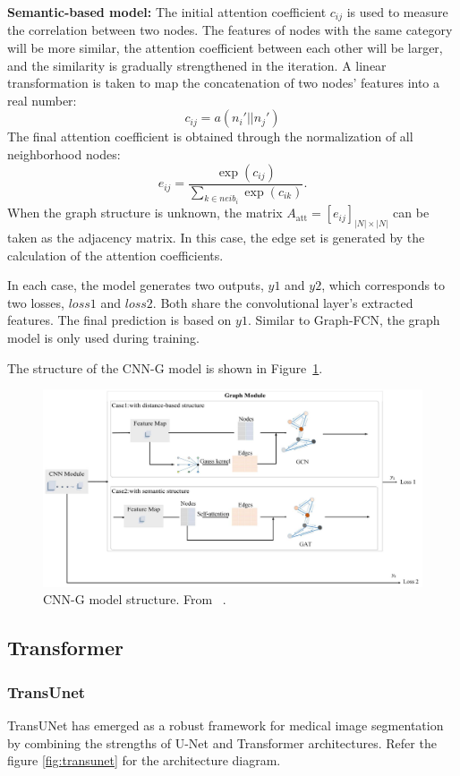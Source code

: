\textbf{Semantic-based model:} The initial attention coefficient $c_{ij}$ is used to measure the correlation between two nodes. The features of nodes with the same category will be more similar, the attention coefficient between each other will be larger, and the similarity is gradually strengthened in the iteration. A linear transformation is taken to map the concatenation of two nodes' features into a real number: 
\[
c_{ij} = a \left( n_i' || n_j' \right)
\]
The final attention coefficient is obtained through the normalization of all neighborhood nodes: 
\[
e_{ij} = \frac{\exp(c_{ij})}{\sum_{k \in neib_{i}} \exp(c_{ik})}.
\]
When the graph structure is unknown, the matrix $A_{\text{att}} = [e_{ij}]_{|N| \times |N|}$ can be taken as the adjacency matrix. In this case, the edge set is generated by the calculation of the attention coefficients.

In each case, the model generates two outputs, $y1$ and $y2$, which corresponds to two losses, $loss1$ and $loss2$. Both share the convolutional layer's extracted features. The final prediction is based on $y1$. Similar to Graph-FCN, the graph model is only used during training.

The structure of the CNN-G model is shown in Figure~\ref{fig:cnng_structure}.
\begin{figure}
    \centering
    \includegraphics[width=0.8\linewidth]{images/cnng_structure.png}
    \caption{CNN-G model structure. From ~\cite{9103557}.}
    \label{fig:cnng_structure}
\end{figure}

\subsection{Transformer}
\subsubsection{TransUnet}
TransUNet \cite{chen2021transunettransformersmakestrong} has emerged as a robust framework for medical image segmentation by combining the strengths of U-Net and Transformer architectures. Refer the figure \ref{fig:transunet} for the architecture diagram.

